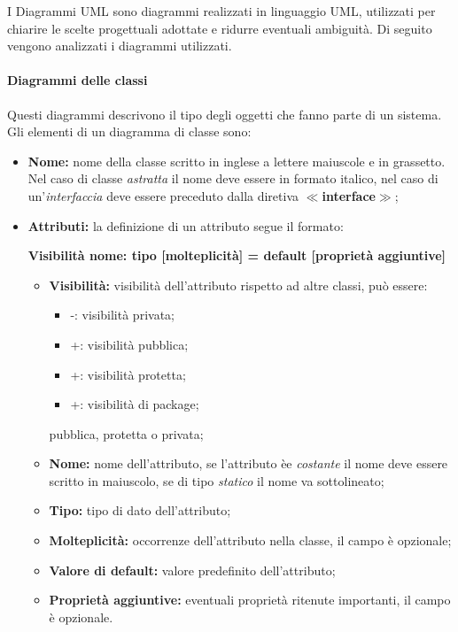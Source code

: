  I Diagrammi UML sono diagrammi realizzati in linguaggio UML, utilizzati per chiarire le scelte progettuali adottate e ridurre eventuali ambiguità. 
Di seguito vengono analizzati i diagrammi utilizzati.
\paragraph*{Diagrammi delle classi}
Questi diagrammi descrivono il tipo degli oggetti che fanno parte di un sistema. \\
Gli elementi di un diagramma di classe sono:
\begin{itemize}
	\item \textbf{Nome:} nome della classe scritto in inglese a lettere maiuscole e in grassetto. Nel caso di classe \textit{astratta} il nome deve essere in formato italico, nel caso di un'\textit{interfaccia} deve essere preceduto dalla diretiva \textbf{$\ll$interface$\gg$};
	\item \textbf{Attributi:} la definizione di un attributo segue il formato:
	\begin{center}
		\textbf{Visibilità nome: tipo [molteplicità] = default [proprietà aggiuntive]}
	\end{center}
	\begin{itemize}
		\item \textbf{Visibilità:} visibilità dell'attributo rispetto ad altre classi, può essere:
		\begin{itemize}
			\item -: visibilità privata;
			\item +: visibilità pubblica;
			\item +: visibilità protetta;
			\item +: visibilità di package;
		\end{itemize} pubblica, protetta o privata;
		\item \textbf{Nome:} nome dell'attributo, se l'attributo èe \textit{costante} il nome deve essere scritto in maiuscolo, se di tipo \textit{statico} il nome va sottolineato;
		\item \textbf{Tipo:} tipo di dato dell'attributo;
		\item \textbf{Molteplicità:} occorrenze dell'attributo nella classe, il campo è opzionale;
		\item \textbf{Valore di default:} valore predefinito dell'attributo;
		\item \textbf{Proprietà aggiuntive:} eventuali proprietà ritenute importanti, il campo è opzionale.
	\end{itemize}

\end{itemize}
